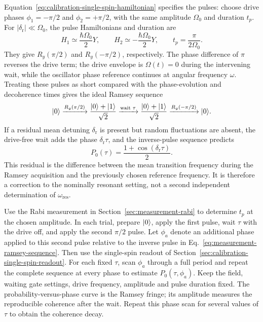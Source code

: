 Equation~\eqref{eq:calibration-single-spin-hamiltonian} specifies the pulses:
choose drive phases $\phi_1=-\pi/2$ and $\phi_2=+\pi/2$,
with the same amplitude $\Omega_0$ and duration $t_p$.
For $|\delta_{\mathrm r}|\ll\Omega_0$, the pulse Hamiltonians and
duration are
\[
 H_1\simeq\frac{\hbar\Omega_0}{2}Y,\qquad
 H_2\simeq-\frac{\hbar\Omega_0}{2}Y,\qquad
 t_p=\frac{\pi}{2\Omega_0}.
\]
They give $R_y(\pi/2)$ and $R_y(-\pi/2)$, respectively.
The phase difference of $\pi$ reverses the drive term;
the drive envelope is $\Omega(t)=0$ during the intervening wait,
while the oscillator phase reference continues at angular frequency
$\omega$.
Treating these pulses as short compared with the phase-evolution
and decoherence times gives the ideal Ramsey sequence
\begin{equation}
 \ket0\xrightarrow{R_y(\pi/2)}
 \frac{\ket0+\ket1}{\sqrt2}
 \xrightarrow{\text{wait }\tau}
 \frac{\ket0+\ket1}{\sqrt2}
 \xrightarrow{R_y(-\pi/2)}\ket0.
 \label{eq:measurement-ramsey-sequence}
\end{equation}
If a residual mean detuning $\delta_{\mathrm r}$ is present but
random fluctuations are absent, the drive-free wait adds the phase
$\delta_{\mathrm r}\tau$, and the inverse-pulse sequence predicts
\begin{equation}
 P_0(\tau)=\frac{1+\cos(\delta_{\mathrm r}\tau)}2.
 \label{eq:measurement-ramsey-ideal}
\end{equation}
This residual is the difference between the mean transition
frequency during the Ramsey acquisition and the previously chosen
reference frequency. It is therefore a correction to the nominally
resonant setting, not a second independent determination of
$\omega_{\mathrm{res}}$.

Use the Rabi measurement in Section~\ref{sec:measurement-rabi}
to determine $t_p$ at the chosen amplitude. In each trial,
prepare $\lvert 0\rangle$, apply the first pulse, wait $\tau$ with the
drive off, and apply the second $\pi/2$ pulse. Let $\phi_a$ denote
an additional phase applied to this second pulse relative to the
inverse pulse in Eq.~\eqref{eq:measurement-ramsey-sequence}.
Then use the single-spin readout of
Section~\ref{sec:calibration-single-spin-readout}. For each fixed
$\tau$, scan $\phi_a$ through a full period and repeat the complete
sequence at every phase to estimate $P_0(\tau,\phi_a)$. Keep the
field, waiting gate settings, drive frequency, amplitude and pulse
duration fixed. The probability-versus-phase curve is the Ramsey
fringe; its amplitude measures the reproducible coherence after
the wait. Repeat this phase scan for several values of $\tau$ to
obtain the coherence decay.

